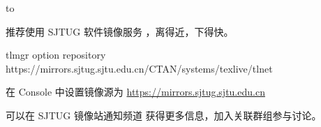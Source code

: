 \begin{shadedsection}
\begin{frame}[plain]
  \hbox to 

  \begin{center}
    \parbox{0.8\textwidth}{
      推荐使用 SJTUG 软件镜像服务 ，离得近，下得快。
      
      \begin{description}
        \footnotesize
        \item[\TeX{} Live]  {\ttfamily tlmgr option repository https://mirrors.sjtug.sjtu.edu.cn/CTAN/systems/texlive/tlnet}
        \item[\hologo{MiKTeX}] 在  Console 中设置镜像源为 \url{https://mirrors.sjtug.sjtu.edu.cn}
        \item[\faTelegram] 可以在 SJTUG 镜像站通知频道  获得更多信息，加入关联群组参与讨论。
      \end{description}
    }
  \end{center}
\end{frame}


\end{shadedsection}
